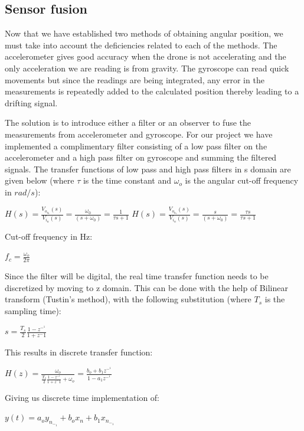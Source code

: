 \subsection{Sensor fusion}
Now that we have established two methods of obtaining angular position, we must take into account the deficiencies related to each of the methods. The accelerometer gives good accuracy when the drone is not accelerating and the only acceleration we are reading is from gravity.
The gyroscope can read quick movements but since the readings are being integrated, any error in the measurements is repeatedly added to the calculated position thereby leading to a drifting signal.

The solution is to introduce either a filter or an observer to fuse the measurements from accelerometer and gyroscope. For our project we have implemented a complimentary filter consisting of a low pass filter on the accelerometer and a high pass filter on gyroscope and summing the filtered signals. \newline
The transfer functions of low pass and high pass filters in s domain are given below (where $\tau$ is the time constant and $\omega _o$ is the angular cut-off frequency in $rad/s$):\newline 

\center $H(s) = \frac{V_o_u_t(s)}{V_i_n(s)} = \frac{\omega_0}{(s+\omega_0)}= \frac{1}{\tau s+1}$
\center $H(s) = \frac{V_o_u_t(s)}{V_i_n(s)} = \frac{s}{(s+\omega_0)}= \frac{\tau s}{\tau s+1}$

\begin{flushleft}
Cut-off frequency in Hz:
\end{flushleft}
$f_c=\frac{\omega _o}{2\pi}$
\newline
\begin{flushleft}
Since the filter will be digital, the real time transfer function needs to be discretized by moving to z domain. This can be done with the help of Bilinear transform (Tustin's method), with the following substitution (where $T_s$ is the sampling time):
\end{flushleft}
$s=\frac{T_s}{2}\frac{1-z^-^1}{1+z^-1}$

\begin{flushleft}
 This results in discrete transfer function: 
\end{flushleft}

$H(z)= \frac{\omega _o}{\frac{T_s}{2}\frac{1-z^-^1}{1+z^-1} + \omega _o}=\frac{b_o + b_1z^-^1}{1-a_1z^-^1}$

\begin{flushleft}
Giving us discrete time implementation of:  
\end{flushleft}
$y(t)=a_o y_n_-_1+b_ox_n+b_1x_n_-_1  $

